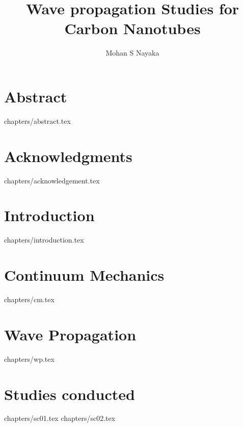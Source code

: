\documentclass[12pt,a4paper,oneside,openright,titlepage]{report}
\author{Mohan S Nayaka}
\title{Wave propagation Studies for Carbon Nanotubes}
\begin{document}
\maketitle
\tableofcontents
\listoffigures
\chapter* {Abstract}
 {chapters/abstract.tex}
\chapter* {Acknowledgments}
 {chapters/acknowledgement.tex}
\chapter {Introduction}
 {chapters/introduction.tex}
\chapter {Continuum Mechanics}
 {chapters/cm.tex}
\chapter {Wave Propagation}
 {chapters/wp.tex}
\chapter {Studies conducted}
 {chapters/sc01.tex}
 {chapters/sc02.tex}


\end{document}
